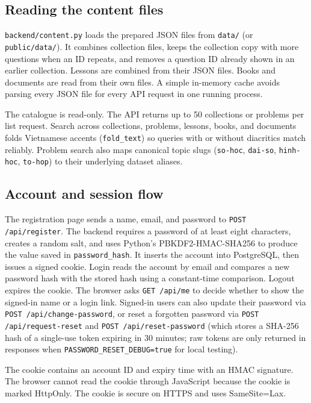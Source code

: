 \subsection{Reading the content files}
\texttt{backend/content.py} loads the prepared JSON files from \texttt{data/} (or \texttt{public/data/}). It combines collection files, keeps the collection copy with more questions when an ID repeats, and removes a question ID already shown in an earlier collection. Lessons are combined from their JSON files. Books and documents are read from their own files. A simple in-memory cache avoids parsing every JSON file for every API request in one running process.

The catalogue is read-only. The API returns up to 50 collections or problems per list request. Search across collections, problems, lessons, books, and documents folds Vietnamese accents (\texttt{fold\_text}) so queries with or without diacritics match reliably. Problem search also maps canonical topic slugs (\texttt{so-hoc}, \texttt{dai-so}, \texttt{hinh-hoc}, \texttt{to-hop}) to their underlying dataset aliases.

\subsection{Account and session flow}
The registration page sends a name, email, and password to \texttt{POST /api/register}. The backend requires a password of at least eight characters, creates a random salt, and uses Python's PBKDF2-HMAC-SHA256 to produce the value saved in \texttt{password\_hash}. It inserts the account into PostgreSQL, then issues a signed cookie. Login reads the account by email and compares a new password hash with the stored hash using a constant-time comparison. Logout expires the cookie. The browser asks \texttt{GET /api/me} to decide whether to show the signed-in name or a login link. Signed-in users can also update their password via \texttt{POST /api/change-password}, or reset a forgotten password via \texttt{POST /api/request-reset} and \texttt{POST /api/reset-password} (which stores a SHA-256 hash of a single-use token expiring in 30 minutes; raw tokens are only returned in responses when \texttt{PASSWORD\_RESET\_DEBUG=true} for local testing).

The cookie contains an account ID and expiry time with an HMAC signature. The browser cannot read the cookie through JavaScript because the cookie is marked HttpOnly. The cookie is secure on HTTPS and uses SameSite=Lax.

